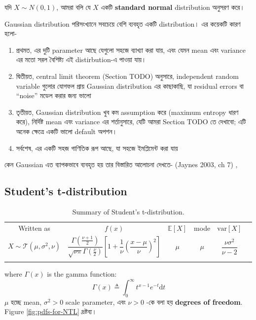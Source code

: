 \documentclass[graybox, envcountchap, twocolumn]{styles/svmult}
\begin{document}
\bengalifont
যদি $X \sim N(0,1)$, আমরা বলি যে $X$ একটি \textbf{standard normal} distribution অনুসরণ করে।

{\bengalifont Gaussian distribution পরিসংখ্যানে সবচেয়ে বেশি ব্যবহৃত একটি distribution। এর কয়েকটি কারণ হলো- }
\begin{enumerate}
\item {\bengalifont প্রথমত, এর দুটি parameter আছে যেগুলো সহজে ব্যাখ্যা করা যায়, এবং যেমন mean এবং variance এর মতো সরল বৈশিষ্ট্য এই distirbution-এ পাওয়া যায়।}
\item {\bengalifont দ্বিতীয়ত, central limit theorem (Section TODO) অনুসারে, independent random variable গুলোর যোগফল প্রায় Gaussian distribution এর কাছাকাছি, যা residual errors বা “noise” মডেল করার জন্য ভালো }
\item {\bengalifont তৃতীয়ত, Gaussian distribution খুব কম assumption করে (maximum entropy ধারণ করে), নির্দিষ্ট mean এবং variance এর শর্তানুসারে, যেটি আমরা Section TODO তে দেখাবো; এটি অনেক ক্ষেত্রে একটি ভালো default অপশন। }
\item {\bengalifont সর্বশেষ, এর একটি সহজ গাণিতিক রূপ আছে, যা সহজে ইমপ্লিমেন্ট করা যায়}
\end{enumerate}

{\bengalifont কেন Gaussian এত ব্যাপকভাবে ব্যবহৃত হয় তার বিস্তারিত আলোচনা দেখতে-  (Jaynes 2003, ch 7) , }







\subsection{Student's t-distribution}
\begin{table}
\caption{Summary of Student's t-distribution.}
\centering
\begin{tabular}{cccccc}
\hline\noalign{\smallskip}
Written as & $f(x)$ & $\mathbb{E}[X]$ & mode & $\text{var}[X]$ \\
\noalign{\smallskip}\svhline\noalign{\smallskip}
$X \sim \mathcal{T}(\mu,\sigma^2,\nu)$ & $\dfrac{\Gamma(\frac{\nu+1}{2})}{\sqrt{\nu\pi}\Gamma(\frac{\nu}{2})}\left[1+\dfrac{1}{\nu}\left(\dfrac{x-\mu}{\nu}\right)^2\right]$ & $\mu$ & $\mu$ & $\dfrac{\nu\sigma^2}{\nu-2}$ \\
\noalign{\smallskip}\hline
\end{tabular}
\end{table}
where  $\Gamma(x)$ is the gamma function:
\begin{equation}
\Gamma(x) \triangleq \int_0^\infty t^{x-1}e^{-t}\mathrm{d}t
\end{equation}
\bengalifont
$\mu$ হচ্ছে mean, $\sigma^2>0$ scale parameter, এবং  $\nu>0$ -কে বলা হয় \textbf{degrees of freedom}. Figure \ref{fig:pdfs-for-NTL} দ্রষ্টব্য। 
\end{document}
